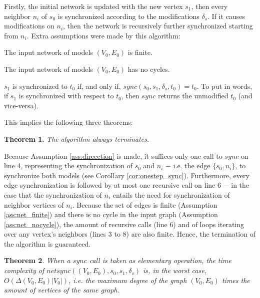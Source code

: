 \documentclass[tuberlin,cic,tc,english,noabntcite,oneside]{iiufrgs}
\begin{document}
Firstly, the initial network is updated with the new vertex $s_1$, then every neighbor $n_i$ of $s_0$ is synchronized according to the modifications $\delta_s$. If it causes modifications on $n_i$, then the network is recursively further synchronized starting from $n_i$. Extra assumptions were made by this algorithm:

\begin{assumption}
\label{ass:net_finite}
	The input network of models $(V_0,E_0)$ is finite.
\end{assumption}

\begin{assumption}
\label{ass:net_nocycle}
	The input network of models $(V_0,E_0)$ has no cycles.
\end{assumption}

\begin{assumption}
\label{ass:onestep_sync}
	$s_1$ is synchronized to $t_0$ if, and only if, $sync(s_0, s_1, \delta_s, t_0) = t_0$. To put in words, if $s_1$ is synchronized with respect to $t_0$, then $sync$ returns the unmodified $t_0$ (and vice-versa).
\end{assumption}

This implies the following three theorems:

\newtheorem{theorem}{Theorem}
\begin{theorem}
	The algorithm always terminates.
\end{theorem}

Because Assumption \ref{ass:direcetion} is made, it suffices only one call to $sync$ on line 4, representing the synchronization of $s_0$ and $n_i$ $-$ i.e. the edge $\{s_0,n_i\}$, to synchronize both models (see Corollary \ref{cor:onestep_sync}). Furthermore, every edge synchronization is followed by at most one recursive call on line 6 $-$ in the case that the synchronization of $n_i$ entails the need for synchronization of neighbor vertices of $n_i$. Because the set of edges is finite (Assumption \ref{ass:net_finite}) and there is no cycle in the input graph (Assumption \ref{ass:net_nocycle}), the amount of recursive calls (line 6) and of loops iterating over any vertex's neighbors (lines 3 to 8) are also finite. Hence, the termination of the algorithm is guaranteed.

\begin{theorem}
	When a $sync$ call is taken as elementary operation, the time complexity of $netsync((V_0,E_0), s_0, s_1, \delta_s)$ is, in the worst case, $O(\Delta(V_0,E_0) |V_0|)$, i.e. the \emph{maximum degree} of	the graph $(V_0,E_0)$ times the amount of vertices of the same graph.
\end{theorem}
\end{document}
